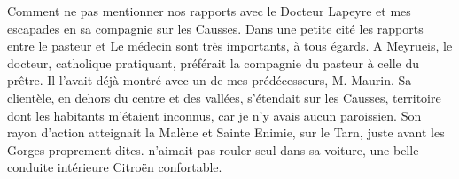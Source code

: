 Comment ne pas mentionner nos rapports avec le Docteur Lapeyre et mes escapades
en sa compagnie sur les Causses. Dans une petite cité les rapports entre le pasteur et
Le médecin sont très importants, à tous égards. A Meyrueis, le docteur, catholique
pratiquant, préférait la compagnie du pasteur à celle du prêtre. Il l’avait déjà montré
avec un de mes prédécesseurs, M. Maurin.
Sa clientèle, en dehors du centre et des vallées, s’étendait sur les Causses, territoire
dont les habitants m’étaient inconnus, car je n’y avais aucun paroissien. Son rayon
d’action atteignait la Malène et Sainte Enimie, sur le Tarn, juste avant les Gorges
proprement dites. n’aimait pas rouler seul dans sa voiture, une belle conduite
intérieure Citroën confortable.
